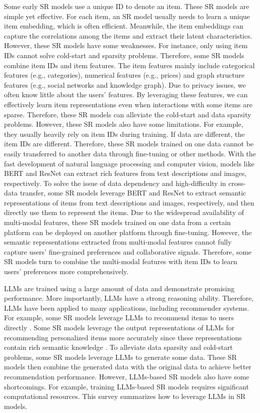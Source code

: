 \documentclass[review]{fcs}
\begin{document}
	Some early SR models \cite{TransRec_t, SASRec} use a unique ID to denote an item. These SR models are simple yet effective. For each item, an SR model usually needs to learn a unique item embedding, which is often efficient. Meanwhile, the item embeddings can capture the correlations among the items and extract their latent characteristics. However, these SR models have some weaknesses. For instance, only using item IDs cannot solve cold-start and sparsity problems. Therefore, some SR models \cite{ICAI-SR, NOVA} combine  item IDs and item features. The item features mainly include categorical features (e.g., categories), numerical features (e.g., prices) and graph structure features (e.g., social networks and knowledge graph).  Due to privacy issues, we often know little about the users' features. By leveraging these features, we can effectively learn item representations even when interactions with some items are sparse. Therefore, these SR models can alleviate the cold-start and data sparsity problems. However, these SR models also have some limitations. For example, they usually heavily rely on item IDs during training. If data are different, the item IDs are different. Therefore, these SR models trained on one data cannot be easily transferred to another data through fine-tuning or other methods. With the fast development of natural language processing and computer vision, models like BERT \cite{BERT} and ResNet \cite{ResNet} can extract rich features from text descriptions and images, respectively. To solve  the issue of data dependency and high-difficulty in cross-data transfer, some SR models \cite{MoRec, UniSRec} leverage BERT and ResNet to extract semantic representations of items from text descriptions and images, respectively, and then directly use them to represent the items. Due to the widespread availability of multi-modal features, these SR models trained on one data from a certain platform can be deployed on another platform through fine-tuning. However, the semantic representations extracted from multi-modal features cannot fully capture users' fine-grained preferences and collaborative signals. Therefore, some SR models turn to combine the multi-modal features with item IDs to learn users' preferences more comprehensively.
	
	LLMs are trained using a large amount of data and demonstrate promising performance. More importantly, LLMs have a strong reasoning ability. Therefore, LLMs have been applied to many applications, including recommender systems. For example, some SR models leverage LLMs to recommend items to users directly \cite{GenRec}. Some SR models leverage the output representations of LLMs for recommending personalized items more accurately since these representations contain rich semantic knowledge \cite{LLMs_based_SR}. To alleviate data sparsity and cold-start problems, some SR models leverage LLMs to generate some data. These SR models then combine the generated data with the original data to achieve better recommendation performance. However, LLMs-based SR models also have some shortcomings. For example, training LLMs-based SR models requires significant computational resources. This survey summarizes how to leverage LLMs in SR models.
	
\end{document}
